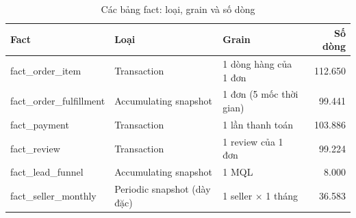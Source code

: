 \begin{table}[htbp]
\centering\small
\caption{Các bảng fact: loại, grain và số dòng}
\label{tab:facts}
\begin{tabular}{lllr}
\toprule
\textbf{Fact} & \textbf{Loại} & \textbf{Grain} & \textbf{Số dòng} \\
\midrule
fact\_order\_item & Transaction & 1 dòng hàng của 1 đơn & 112.650 \\
fact\_order\_fulfillment & Accumulating snapshot & 1 đơn (5 mốc thời gian) & 99.441 \\
fact\_payment & Transaction & 1 lần thanh toán & 103.886 \\
fact\_review & Transaction & 1 review của 1 đơn & 99.224 \\
fact\_lead\_funnel & Accumulating snapshot & 1 MQL & 8.000 \\
fact\_seller\_monthly & Periodic snapshot (dày đặc) & 1 seller × 1 tháng & 36.583 \\
\bottomrule
\end{tabular}
\end{table}
